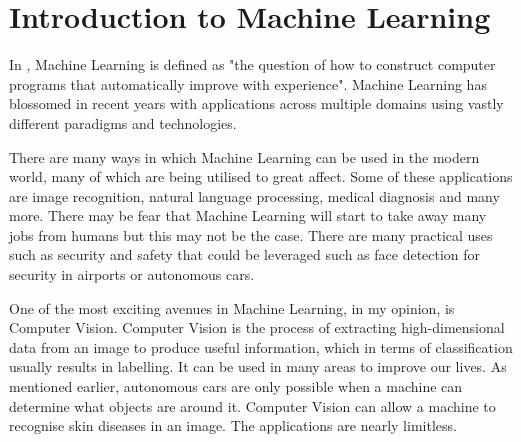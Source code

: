 \section{Introduction to Machine Learning}
In \textcite{MLANN}, Machine Learning is defined as "the question of how to
construct computer programs that automatically improve with experience".
Machine Learning has blossomed in recent years with applications across multiple
domains using vastly different paradigms and technologies.

There are many ways in which Machine Learning can be used in the modern world,
many of which are being utilised to great affect.
Some of these applications are image recognition, natural language
processing,
medical diagnosis and many more.
There may be fear that Machine Learning will start to take away many jobs
from
humans but this may not be the case. There are many practical uses such as security and safety that could be leveraged such as face detection for security in airports or autonomous cars.

One of the most exciting avenues in Machine Learning, in my opinion, is
Computer
Vision. Computer Vision is the process of extracting high-dimensional data from an image to produce useful information, which in terms of classification usually results in labelling. It can be used in many areas to improve our lives. As
mentioned earlier, autonomous cars are only possible when a machine can
determine what objects are around it. Computer Vision can allow a machine to
recognise skin diseases in an image. The applications are nearly limitless.

